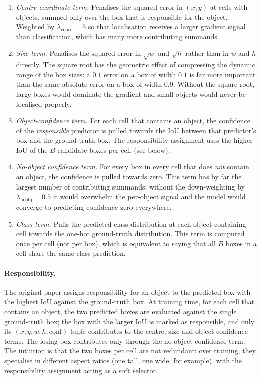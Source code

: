 \begin{enumerate}
    \item \emph{Centre-coordinate term.} Penalises the squared error in
        $(x, y)$ at cells with objects, summed only over the box that is
        responsible for the object. Weighted by $\lambda_{\text{coord}} = 5$
        so that localisation receives a larger gradient signal than
        classification, which has many more contributing summands.
    \item \emph{Size term.} Penalises the squared error in $\sqrt{w}$ and
        $\sqrt{h}$ rather than in $w$ and $h$ directly. The square root has
        the geometric effect of compressing the dynamic range of the box
        sizes: a $0.1$ error on a box of width $0.1$ is far more important
        than the same absolute error on a box of width $0.9$. Without the
        square root, large boxes would dominate the gradient and small
        objects would never be localised properly.
    \item \emph{Object-confidence term.} For each cell that contains an
        object, the confidence of the \emph{responsible} predictor is pulled
        towards the IoU between that predictor's box and the ground-truth
        box. The responsibility assignment uses the higher-IoU of the $B$
        candidate boxes per cell (see below).
    \item \emph{No-object confidence term.} For every box in every cell that
        does \emph{not} contain an object, the confidence is pulled towards
        zero. This term has by far the largest number of contributing
        summands; without the down-weighting by
        $\lambda_{\text{noobj}} = 0.5$ it would overwhelm the per-object
        signal and the model would converge to predicting confidence zero
        everywhere.
    \item \emph{Class term.} Pulls the predicted class distribution at each
        object-containing cell towards the one-hot ground-truth distribution.
        This term is computed once per cell (not per box), which is
        equivalent to saying that all $B$ boxes in a cell share the same
        class prediction.
\end{enumerate}

\paragraph{Responsibility.} The original paper assigns responsibility for an
object to the predicted box with the highest IoU against the ground-truth
box. At training time, for each cell that contains an object, the two
predicted boxes are evaluated against the single ground-truth box; the box
with the larger IoU is marked as responsible, and only its $(x, y, w, h,
\text{conf})$ tuple contributes to the centre, size and object-confidence
terms. The losing box contributes only through the no-object confidence term.
The intuition is that the two boxes per cell are not redundant: over
training, they specialise in different aspect ratios (one tall, one wide, for
example), with the responsibility assignment acting as a soft selector.

